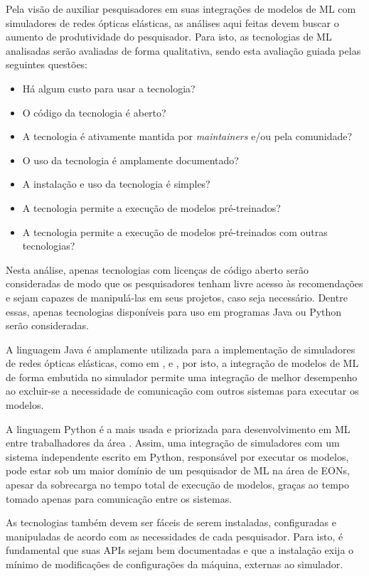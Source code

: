 Pela visão de auxiliar pesquisadores em suas integrações de modelos de ML com simuladores de redes ópticas elásticas, as análises aqui feitas devem buscar o aumento de produtividade do pesquisador. Para isto, as tecnologias de ML analisadas serão avaliadas de forma qualitativa, sendo esta avaliação guiada pelas seguintes questões:

\begin{itemize}
    \item Há algum custo para usar a tecnologia?
    \item O código da tecnologia é aberto?
    \item A tecnologia é ativamente mantida por \textit{maintainers} e/ou pela comunidade?
    \item O uso da tecnologia é amplamente documentado?
    \item A instalação e uso da tecnologia é simples?
    \item A tecnologia permite a execução de modelos pré-treinados?
    \item A tecnologia permite a execução de modelos pré-treinados com outras tecnologias?
\end{itemize}

Nesta análise, apenas tecnologias com licenças de código aberto serão consideradas de modo que os pesquisadores tenham livre acesso às recomendações e sejam capazes de manipulá-las em seus projetos, caso seja necessário. Dentre essas, apenas tecnologias disponíveis para uso em programas Java ou Python serão consideradas.

A linguagem Java é amplamente utilizada para a implementação de simuladores de redes ópticas elásticas, como em \cite{costa2016ons}, \cite{ceons2015} e \cite{net2plan}, por isto, a integração de modelos de ML de forma embutida no simulador permite uma integração de melhor desempenho ao excluir-se a necessidade de comunicação com outros sistemas para executar os modelos.

A linguagem Python é a mais usada e priorizada para desenvolvimento em ML entre trabalhadores da área \cite{developer_nation_q1_2017}. Assim, uma integração de simuladores com um sistema independente escrito em Python, responsável por executar os modelos, pode estar sob um maior domínio de um pesquisador de ML na área de EONs, apesar da sobrecarga no tempo total de execução de modelos, graças ao tempo tomado apenas para comunicação entre os sistemas.

As tecnologias também devem ser fáceis de serem instaladas, configuradas e manipuladas de acordo com as necessidades de cada pesquisador. Para isto, é fundamental que suas \acrshort{API}s sejam bem documentadas e que a instalação exija o mínimo de modificações de configurações da máquina, externas ao simulador.

